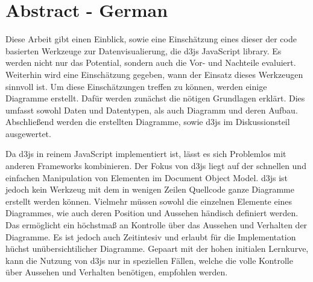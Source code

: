 \chapter*{Abstract - German} %



Diese Arbeit gibt einen Einblick, sowie eine Einschätzung eines dieser der code basierten Werkzeuge zur Datenvisualierung, die d3js JavaScript library. Es werden nicht nur das Potential, sondern auch die Vor- und Nachteile evaluiert. Weiterhin wird eine Einschätzung gegeben, wann der Einsatz dieses Werkzeugen sinnvoll ist. Um diese Einschätzungen treffen zu können, werden einige Diagramme erstellt. Dafür werden zunächst die nötigen Grundlagen erklärt. Dies umfasst sowohl Daten und Datentypen, als auch Diagramm und deren Aufbau. Abschließend werden die erstellten Diagramme, sowie d3js im Diskussionsteil ausgewertet.

Da d3js in reinem JavaScript implementiert ist, lässt es sich Problemlos mit anderen Frameworks kombinieren. Der Fokus von d3js liegt auf der schnellen und einfachen Manipulation von Elementen im Document Object Model. d3js ist jedoch kein Werkzeug mit dem in wenigen Zeilen Quellcode ganze Diagramme erstellt werden können. Vielmehr müssen sowohl die einzelnen Elemente eines Diagrammes, wie auch deren Position und Aussehen händisch definiert werden. Das ermöglicht ein höchstmaß an Kontrolle über das Aussehen und Verhalten der Diagramme. Es ist jedoch auch Zeitintesiv und erlaubt für die Implementation hüchst unübersichtilicher Diagramme. Gepaart mit der hohen initialen Lernkurve, kann die Nutzung von d3js nur in speziellen Fällen, welche die volle Kontrolle über Aussehen und Verhalten benötigen, empfohlen werden.